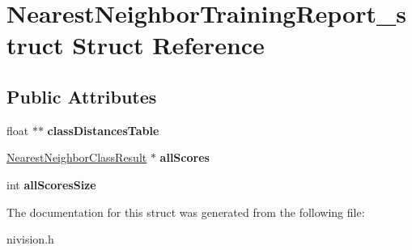 \hypertarget{structNearestNeighborTrainingReport__struct}{\section{\-Nearest\-Neighbor\-Training\-Report\-\_\-struct \-Struct \-Reference}
\label{structNearestNeighborTrainingReport__struct}
}
\subsection*{\-Public \-Attributes}
\begin{DoxyCompactItemize}
\item 
\hypertarget{structNearestNeighborTrainingReport__struct_a738b91029be72ef7a0ee2e6fc759949f}{float $\ast$$\ast$ {\bfseries class\-Distances\-Table}}\label{structNearestNeighborTrainingReport__struct_a738b91029be72ef7a0ee2e6fc759949f}

\item 
\hypertarget{structNearestNeighborTrainingReport__struct_adad061c210cc13ad85ceaada0e801b9b}{\hyperlink{structNearestNeighborClassResult__struct}{\-Nearest\-Neighbor\-Class\-Result} $\ast$ {\bfseries all\-Scores}}\label{structNearestNeighborTrainingReport__struct_adad061c210cc13ad85ceaada0e801b9b}

\item 
\hypertarget{structNearestNeighborTrainingReport__struct_a63df069ef1cb8eca759036389fdbbe71}{int {\bfseries all\-Scores\-Size}}\label{structNearestNeighborTrainingReport__struct_a63df069ef1cb8eca759036389fdbbe71}

\end{DoxyCompactItemize}


\-The documentation for this struct was generated from the following file\-:\begin{DoxyCompactItemize}
\item 
nivision.\-h\end{DoxyCompactItemize}
